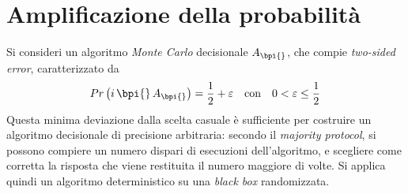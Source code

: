 \section{Amplificazione della probabilità}

Si consideri un algoritmo \emph{Monte Carlo} decisionale $
A_{\bpi{}}
$, che compie \emph{two-sided error}, caratterizzato da
\begin{equation*}
    Pr \left( 
        i
        \,
        \bpi{}
        \,
        A_{\bpi{}}
    \right)
    =
    \frac{1}{2} + \varepsilon
    \quad
    \text{con}
    \quad
    0 < \varepsilon \leq \frac{1}{2}
\end{equation*}
Questa minima deviazione dalla scelta casuale è sufficiente per costruire un algoritmo decisionale di precisione arbitraria: secondo il \emph{majority protocol}, si possono compiere un numero dispari di esecuzioni dell'algoritmo, e scegliere come corretta la risposta che viene restituita il numero maggiore di volte.
Si applica quindi un algoritmo deterministico su una \emph{black box} randomizzata.

